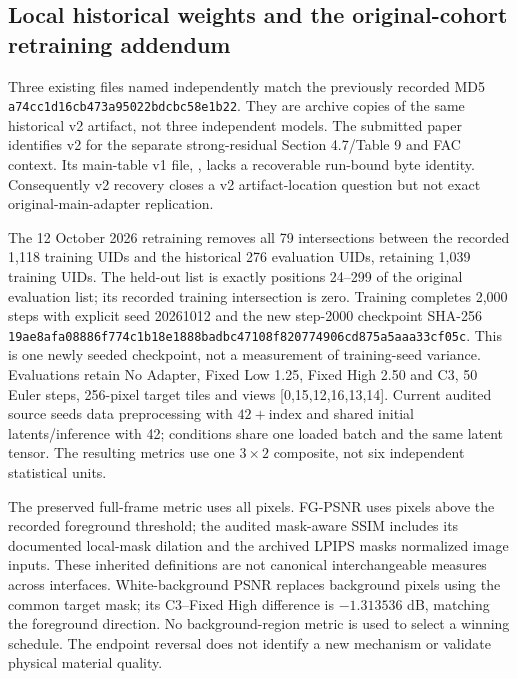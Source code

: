 \documentclass[11pt]{article}
\begin{document}
\subsection*{Local historical weights and the original-cohort retraining addendum}
Three existing files named  independently match the previously recorded MD5 \texttt{a74cc1d16cb473a95022bdcbc58e1b22}. They are archive copies of the same historical v2 artifact, not three independent models. The submitted paper identifies v2 for the separate strong-residual Section 4.7/Table 9 and FAC context. Its main-table v1 file, , lacks a recoverable run-bound byte identity. Consequently v2 recovery closes a v2 artifact-location question but not exact original-main-adapter replication.

The 12 October 2026 retraining removes all 79 intersections between the recorded 1,118 training UIDs and the historical 276 evaluation UIDs, retaining 1,039 training UIDs. The held-out list is exactly positions 24--299 of the original evaluation list; its recorded training intersection is zero. Training completes 2,000 steps with explicit seed 20261012 and the new step-2000 checkpoint SHA-256 \texttt{19ae8afa08886f774c1b18e1888badbc47108f820774906cd875a5aaa33cf05c}. This is one newly seeded checkpoint, not a measurement of training-seed variance. Evaluations retain No Adapter, Fixed Low 1.25, Fixed High 2.50 and C3, 50 Euler steps, 256-pixel target tiles and views [0,15,12,16,13,14]. Current audited source seeds data preprocessing with $42+\mathrm{index}$ and shared initial latents/inference with 42; conditions share one loaded batch and the same latent tensor. The resulting metrics use one $3\times2$ composite, not six independent statistical units.

The preserved full-frame metric uses all pixels. FG-PSNR uses pixels above the recorded foreground threshold; the audited mask-aware SSIM includes its documented local-mask dilation and the archived LPIPS masks normalized image inputs. These inherited definitions are not canonical interchangeable measures across interfaces. White-background PSNR replaces background pixels using the common target mask; its C3--Fixed High difference is $-1.313536$ dB, matching the foreground direction. No background-region metric is used to select a winning schedule. The endpoint reversal does not identify a new mechanism or validate physical material quality.
\end{document}
